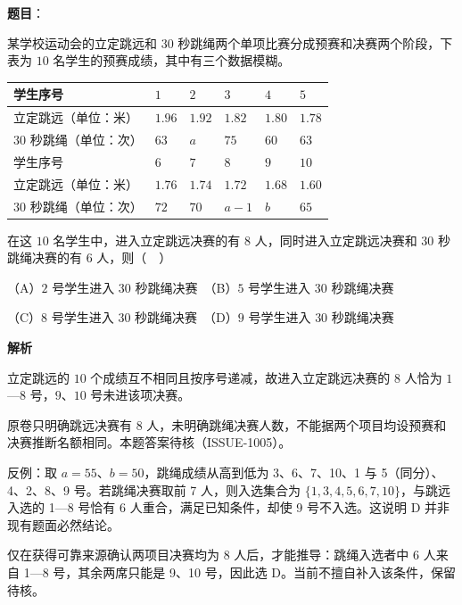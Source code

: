 \begin{answer}

\textbf{题目}：

某学校运动会的立定跳远和 \(30\) 秒跳绳两个单项比赛分成预赛和决赛两个阶段，下表为 \(10\) 名学生的预赛成绩，其中有三个数据模糊。

\begin{center}
\begin{tabular}{llllll}
\toprule
学生序号 & \(1\) & \(2\) & \(3\) & \(4\) & \(5\) \\
\midrule
立定跳远（单位：米） & \(1.96\) & \(1.92\) & \(1.82\) & \(1.80\) & \(1.78\) \\
\(30\) 秒跳绳（单位：次） & \(63\) & \(a\) & \(75\) & \(60\) & \(63\) \\
学生序号 & \(6\) & \(7\) & \(8\) & \(9\) & \(10\) \\
立定跳远（单位：米） & \(1.76\) & \(1.74\) & \(1.72\) & \(1.68\) & \(1.60\) \\
\(30\) 秒跳绳（单位：次） & \(72\) & \(70\) & \(a-1\) & \(b\) & \(65\) \\
\bottomrule
\end{tabular}
\end{center}

在这 \(10\) 名学生中，进入立定跳远决赛的有 \(8\) 人，同时进入立定跳远决赛和 \(30\) 秒跳绳决赛的有 \(6\) 人，则（　）

（A）\(2\) 号学生进入 \(30\) 秒跳绳决赛　（B）\(5\) 号学生进入 \(30\) 秒跳绳决赛

（C）\(8\) 号学生进入 \(30\) 秒跳绳决赛　（D）\(9\) 号学生进入 \(30\) 秒跳绳决赛

\textbf{解析}

立定跳远的 \(10\) 个成绩互不相同且按序号递减，故进入立定跳远决赛的 \(8\) 人恰为 \(1\)—\(8\) 号，\(9\)、\(10\) 号未进该项决赛。

原卷只明确跳远决赛有 8 人，未明确跳绳决赛人数，不能据两个项目均设预赛和决赛推断名额相同。本题答案待核（ISSUE-1005）。

反例：取 \(a=55\)、\(b=50\)，跳绳成绩从高到低为 3、6、7、10、1 与 5（同分）、4、2、8、9 号。若跳绳决赛取前 7 人，则入选集合为 \(\{1,3,4,5,6,7,10\}\)，与跳远入选的 1—8 号恰有 6 人重合，满足已知条件，却使 9 号不入选。这说明 D 并非现有题面必然结论。

仅在获得可靠来源确认两项目决赛均为 8 人后，才能推导：跳绳入选者中 6 人来自 1—8 号，其余两席只能是 9、10 号，因此选 D。当前不擅自补入该条件，保留待核。


\end{answer}

